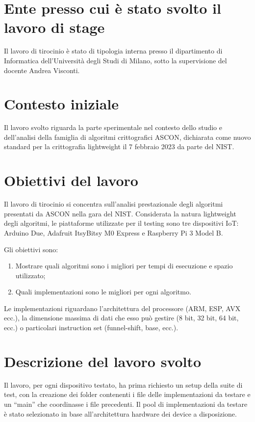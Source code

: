 \documentclass[a4paper, 12pt, italian]{extarticle}
\begin{document}
\section{Ente presso cui è stato svolto il lavoro di stage}

Il lavoro di tirocinio è stato di tipologia interna presso il dipartimento di Informatica dell'Università degli Studi di Milano, sotto la supervisione del docente Andrea Visconti.

\section{Contesto iniziale}

Il lavoro svolto riguarda la parte sperimentale nel contesto dello studio e dell'analisi della famiglia di algoritmi crittografici ASCON, dichiarata come nuovo standard per la crittografia lightweight il 7 febbraio 2023 da parte del NIST.

\section{Obiettivi del lavoro}

Il lavoro di tirocinio si concentra sull'analisi prestazionale degli algoritmi presentati da ASCON nella gara del NIST. Considerata la natura lightweight degli algoritmi, le piattaforme utilizzate per il testing sono tre dispositivi IoT: Arduino Due, Adafruit ItsyBitsy M0 Express e Raspberry Pi 3 Model B. 

Gli obiettivi sono:
\begin{enumerate}[label=\Roman*.]
    \item Mostrare quali algoritmi sono i migliori per tempi di esecuzione e spazio utilizzato;
    \item Quali implementazioni sono le migliori per ogni algoritmo.
\end{enumerate}

Le implementazioni riguardano l'architettura del processore (ARM, ESP, AVX ecc.), la dimensione massima di dati che esso può gestire (8 bit, 32 bit, 64 bit, ecc.) o particolari instruction set (funnel-shift, base, ecc.).

\section{Descrizione del lavoro svolto}

Il lavoro, per ogni dispositivo testato, ha prima richiesto un setup della suite di test, con la creazione dei folder contenenti i file delle implementazioni da testare e un ``main'' che coordinasse i file precedenti. Il pool di implementazioni da testare è stato selezionato in base all'architettura hardware dei device a disposizione.
\end{document}
